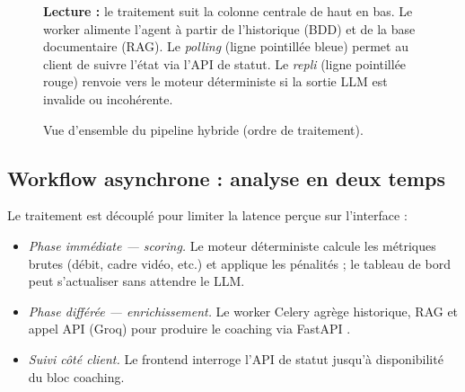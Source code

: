 ﻿\documentclass[12pt,a4paper]{article}
\begin{document}
\begin{figure}[H]
    \caption{Vue d'ensemble du pipeline hybride (ordre de traitement).}
    \begin{minipage}{0.94\linewidth}\footnotesize
    \textbf{Lecture :} le traitement suit la colonne centrale de haut en bas. Le worker alimente l'agent à partir de l'historique (BDD) et de la base documentaire (RAG). Le \emph{polling} (ligne pointillée bleue) permet au client de suivre l'état via l'API de statut. Le \emph{repli} (ligne pointillée rouge) renvoie vers le moteur déterministe si la sortie LLM est invalide ou incohérente.
    \end{minipage}
\end{figure}

\subsection{Workflow asynchrone : analyse en deux temps}
Le traitement est découplé pour limiter la latence perçue sur l'interface :
\begin{itemize}
    \item \textit{Phase immédiate — scoring.} Le moteur déterministe calcule les métriques brutes (débit, cadre vidéo, etc.) et applique les pénalités ; le tableau de bord peut s'actualiser sans attendre le LLM.
    \item \textit{Phase différée — enrichissement.} Le worker Celery \cite{celery} agrège historique, RAG et appel API (Groq) pour produire le coaching via FastAPI \cite{fastapi}.
    \item \textit{Suivi côté client.} Le frontend interroge l'API de statut jusqu'à disponibilité du bloc coaching.
\end{itemize}
\end{document}
